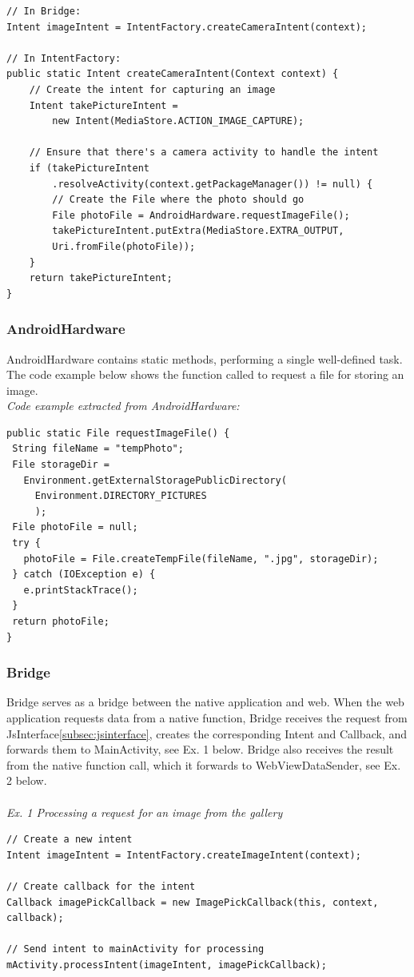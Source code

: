 	\begin{lstlisting}
// In Bridge:
Intent imageIntent = IntentFactory.createCameraIntent(context);
		
// In IntentFactory:
public static Intent createCameraIntent(Context context) {
	// Create the intent for capturing an image
	Intent takePictureIntent = 
		new Intent(MediaStore.ACTION_IMAGE_CAPTURE);
	
	// Ensure that there's a camera activity to handle the intent
	if (takePictureIntent
		.resolveActivity(context.getPackageManager()) != null) {
		// Create the File where the photo should go
		File photoFile = AndroidHardware.requestImageFile();
		takePictureIntent.putExtra(MediaStore.EXTRA_OUTPUT,
		Uri.fromFile(photoFile));
	}
	return takePictureIntent;
}
\end{lstlisting}
	
\subsubsection{AndroidHardware}
AndroidHardware contains static methods, performing a single well-defined task. The code example below shows the function called to request a file for storing an image.
	\\
	\emph{Code example extracted from AndroidHardware:}
\begin{lstlisting}
public static File requestImageFile() {
 String fileName = "tempPhoto";
 File storageDir = 
   Environment.getExternalStoragePublicDirectory(
     Environment.DIRECTORY_PICTURES
     );
 File photoFile = null;
 try {
   photoFile = File.createTempFile(fileName, ".jpg", storageDir);
 } catch (IOException e) {
   e.printStackTrace();
 }
 return photoFile;
}
\end{lstlisting}
	
\subsubsection{Bridge} 
Bridge serves as a bridge between the native application and web. When the web application requests data from a native function, Bridge receives the request from JsInterface\ref{subsec:jsinterface}, creates the corresponding Intent and Callback, and forwards them to MainActivity, see Ex. 1 below. Bridge also receives the result from the native function call, which it forwards to WebViewDataSender, see Ex. 2 below.
\\\\
\emph{Ex. 1 Processing a request for an image from the gallery}
\begin{lstlisting}
// Create a new intent
Intent imageIntent = IntentFactory.createImageIntent(context);

// Create callback for the intent
Callback imagePickCallback = new ImagePickCallback(this, context, callback);

// Send intent to mainActivity for processing
mActivity.processIntent(imageIntent, imagePickCallback);
\end{lstlisting}

